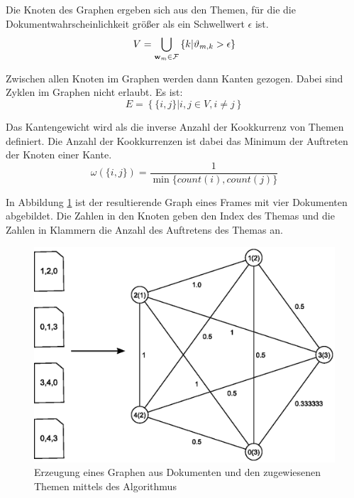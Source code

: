 Die Knoten des Graphen ergeben sich aus den Themen, für die die Dokumentwahrscheinlichkeit größer als ein Schwellwert $\epsilon$ ist.
\begin{equation}
V = \bigcup_{\mathbf{w}_m \in \mathcal{F}} \left\{ k | \vartheta_{m,k} > \epsilon\right\}
\end{equation}

Zwischen allen Knoten im Graphen werden dann Kanten gezogen. Dabei sind Zyklen im Graphen nicht erlaubt. Es ist:
\begin{equation}
E = \left\{ \{i,j\} | i,j \in V, i \neq j \right\}
\end{equation}

Das Kantengewicht wird als die inverse Anzahl der Kookkurrenz von Themen definiert. Die Anzahl der Kookkurrenzen ist dabei das Minimum der Auftreten der Knoten einer Kante. 
\begin{equation}
\omega(\{i,j\}) = \frac{1}{\min \{count(i),count(j)\} } 
\end{equation}

In Abbildung \ref{fig:simpleFrameToGraph} ist der resultierende Graph eines Frames mit vier Dokumenten abgebildet. Die Zahlen in den Knoten geben den Index des Themas und die Zahlen in Klammern die Anzahl des Auftretens des Themas an. 

\begin{figure}
\centering
\includegraphics[scale=.6]{images/content/05_workflowTime/simpleFrameToGraph}
\caption{Erzeugung eines Graphen aus Dokumenten und den zugewiesenen Themen mittels des Algorithmus \CST}
\label{fig:simpleFrameToGraph}
\end{figure}

